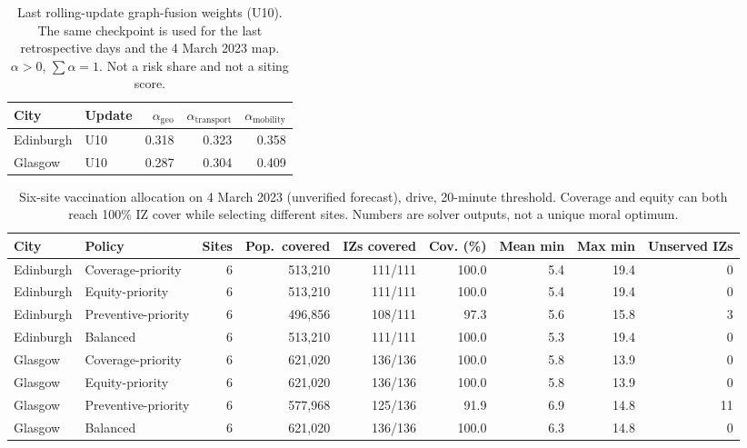 \begin{table}[t]
  \caption{Last rolling-update graph-fusion weights (U10). The same checkpoint is used for the last retrospective days and the 4 March 2023 map. $\alpha>0$, $\sum\alpha=1$. Not a risk share and not a siting score.}
  \label{tab:alpha}
  \small
  \centering
  \begin{tabular}{llrrr}
    \toprule
    City & Update & $\alpha_{\mathrm{geo}}$ & $\alpha_{\mathrm{transport}}$ & $\alpha_{\mathrm{mobility}}$ \\
    \midrule
    Edinburgh & U10 & 0.318 & 0.323 & 0.358 \\
    Glasgow & U10 & 0.287 & 0.304 & 0.409 \\
    \bottomrule
  \end{tabular}
\end{table}

\begin{table}[t]
  \caption{Six-site vaccination allocation on 4 March 2023 (unverified forecast), drive, 20-minute threshold. Coverage and equity can both reach 100\% IZ cover while selecting different sites. Numbers are solver outputs, not a unique moral optimum.}
  \label{tab:allocation}
  \small
  \centering
  \begin{tabular}{llrrrrrrr}
    \toprule
    City & Policy & Sites & Pop.\ covered & IZs covered & Cov. (\%) & Mean min & Max min & Unserved IZs \\
    \midrule
    Edinburgh & Coverage-priority & 6 & 513,210 & 111/111 & 100.0 & 5.4 & 19.4 & 0 \\
Edinburgh & Equity-priority & 6 & 513,210 & 111/111 & 100.0 & 5.4 & 19.4 & 0 \\
Edinburgh & Preventive-priority & 6 & 496,856 & 108/111 & 97.3 & 5.6 & 15.8 & 3 \\
Edinburgh & Balanced & 6 & 513,210 & 111/111 & 100.0 & 5.3 & 19.4 & 0 \\
Glasgow & Coverage-priority & 6 & 621,020 & 136/136 & 100.0 & 5.8 & 13.9 & 0 \\
Glasgow & Equity-priority & 6 & 621,020 & 136/136 & 100.0 & 5.8 & 13.9 & 0 \\
Glasgow & Preventive-priority & 6 & 577,968 & 125/136 & 91.9 & 6.9 & 14.8 & 11 \\
Glasgow & Balanced & 6 & 621,020 & 136/136 & 100.0 & 6.3 & 14.8 & 0 \\
    \bottomrule
  \end{tabular}
\end{table}
